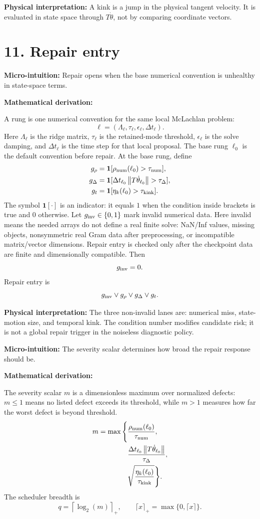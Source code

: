 \documentclass[10pt,twocolumn]{article}
\newcommand{\norm}[1]{\left\lVert #1\right\rVert}
\newcommand{\micro}[1]{%
  \par\smallskip
  \noindent\textcolor{deepblue}{\textbf{Micro-intuition:}} #1
  \par\smallskip}
\newcommand{\deriv}{%
  \par\noindent\textcolor{deepviolet}{\textbf{Mathematical derivation:}}\par\vspace{-1mm}}
\newcommand{\phys}[1]{%
  \par\smallskip
  \noindent\textcolor{deepgreen}{\textbf{Physical interpretation:}} #1
  \par\smallskip}
\begin{document}
\phys{A kink is a jump in the physical tangent velocity. It is evaluated in
state space through \(T\dot\theta\), not by comparing coordinate vectors.}

\section*{11. Repair entry}

\micro{Repair opens when the base numerical convention is unhealthy in
state-space terms.}

\deriv
A rung is one numerical convention for the same local McLachlan problem:
\[
\ell=(\Lambda_\ell,\tau_\ell,\epsilon_\ell,\Delta t_\ell).
\]
Here \(\Lambda_\ell\) is the ridge matrix, \(\tau_\ell\) is the retained-mode
threshold, \(\epsilon_\ell\) is the solve damping, and \(\Delta t_\ell\) is the
time step for that local proposal. The base rung \(\ell_0\) is the default
convention before repair. At the base rung, define
\[
\begin{aligned}
g_\rho&=\mathbf 1[\rho_{\rm num}(\ell_0)>\tau_{\rm num}],\\
g_\Delta&=\mathbf 1[\Delta t_{\ell_0}\norm{T\dot\theta_{\ell_0}}>\tau_\Delta],\\
g_t&=\mathbf 1[\eta_k(\ell_0)>\tau_{\rm kink}].
\end{aligned}
\]
The symbol \(\mathbf 1[\cdot]\) is an indicator: it equals \(1\) when the
condition inside brackets is true and \(0\) otherwise. Let
\(g_{\rm inv}\in\{0,1\}\) mark invalid numerical data. Here invalid means the
needed arrays do not define a real finite solve: NaN/Inf values, missing
objects, nonsymmetric real Gram data after preprocessing, or incompatible
matrix/vector dimensions. Repair entry is checked only after the checkpoint
data are finite and dimensionally compatible.
Then
\[
g_{\rm inv}=0.
\]
Repair entry is
\[
g_{\rm inv}\vee g_\rho\vee g_\Delta\vee g_t.
\]

\phys{The three non-invalid lanes are: numerical miss, state-motion size, and
temporal kink. The condition number modifies candidate risk; it is not a
global repair trigger in the noiseless diagnostic policy.}

\micro{The severity scalar determines how broad the repair response should be.}

\deriv
The severity scalar \(m\) is a dimensionless maximum over normalized defects:
\(m\le1\) means no listed defect exceeds its threshold, while \(m>1\) measures
how far the worst defect is beyond threshold.
\[
\begin{aligned}
m
=
\max\Bigg\{
&
\frac{\rho_{\rm num}(\ell_0)}{\tau_{\rm num}},
\\
&
\frac{\Delta t_{\ell_0}\norm{T\dot\theta_{\ell_0}}}{\tau_\Delta},
\\
&
\sqrt{\frac{\eta_k(\ell_0)}{\tau_{\rm kink}}}
\Bigg\}.
\end{aligned}
\]
The scheduler breadth is
\[
q=\left\lceil\log_2(m)\right\rceil_+,
\qquad
\lceil x\rceil_+=\max\{0,\lceil x\rceil\}.
\]
\end{document}
